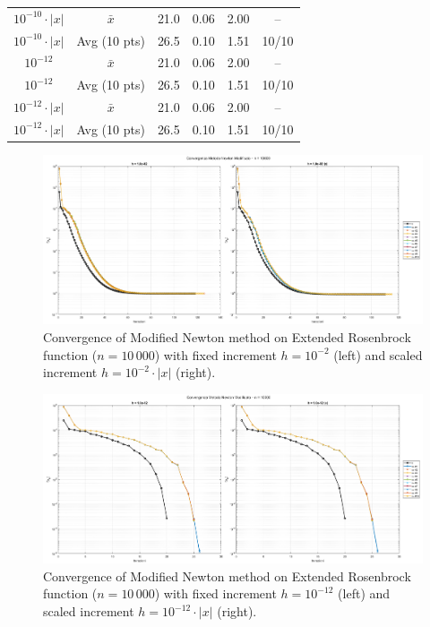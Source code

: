 \documentclass[a4paper,12pt]{article}
\begin{document}
\begin{table}[htbp]
{\begin{tabular}{|c|c|c|c|c|c|}
				$10^{-10}\cdot|x|$   & $\bar{x}$       & 21.0  & 0.06 & 2.00 & --     \\
				$10^{-10}\cdot|x|$   & Avg (10 pts)    & 26.5  & 0.10 & 1.51 & 10/10 \\
				\hline
				$10^{-12}$           & $\bar{x}$       & 21.0  & 0.06 & 2.00 & --     \\
				$10^{-12}$           & Avg (10 pts)    & 26.5  & 0.10 & 1.51 & 10/10 \\
				$10^{-12}\cdot|x|$   & $\bar{x}$       & 21.0  & 0.06 & 2.00 & --     \\
				$10^{-12}\cdot|x|$   & Avg (10 pts)    & 26.5  & 0.10 & 1.51 & 10/10 \\
				\hline
			\end{tabular}%
		}
		\label{tab:fd_results_10k}
	\end{table}
	\newpage
	\begin{figure}[htbp]
		\centering
		\includegraphics[width=\textwidth]{../immagini/ext_10k_h2.png}
		\caption{Convergence of Modified Newton method on Extended Rosenbrock function ($n=10\,000$) with fixed increment $h = 10^{-2}$ (left) and scaled increment $h = 10^{-2}\cdot|x|$ (right).}
		\label{fig:fd_10k_h2}
	\end{figure}
	
	\begin{figure}[htbp]
		\centering
		\includegraphics[width=\textwidth]{../immagini/ext_10k_h12.png}
		\caption{Convergence of Modified Newton method on Extended Rosenbrock function ($n=10\,000$) with fixed increment $h = 10^{-12}$ (left) and scaled increment $h = 10^{-12}\cdot|x|$ (right).}
		\label{fig:fd_10k_h12}
	\end{figure}
	\newpage
\end{document}
